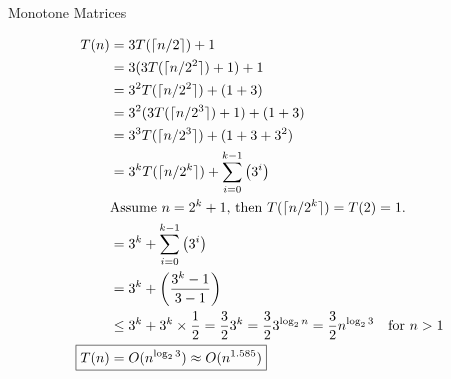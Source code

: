 \documentclass{article}
\begin{document}
\begin{section}{Monotone Matrices}
\begin{enumerate}
    \begin{align*}
        T(n) &= 3T(\ceil{n/2}) + 1 \\
        &= 3(3T(\ceil{n/2^2}) + 1) + 1 \\
        &= 3^2 T(\ceil{n/2^2}) + (1 + 3) \\
        &= 3^2 (3T(\ceil{n/2^3}) + 1) + (1 + 3) \\
        &= 3^3 T(\ceil{n/2^3}) + (1 + 3 + 3^2) \\
        &= 3^{k} T(\ceil{n/2^{k}}) + \sum_{i = 0}^{k-1}\pbracket{3^i} \\
        & \text{Assume $n = 2^k + 1$, then $T(\ceil{n/2^{k}}) = T(2) = 1$.} \\
        &= 3^{k} + \sum_{i = 0}^{k-1}\pbracket{3^i} \\
        &= 3^{k} + \pbracket{\frac{3^{k}-1}{3-1}} \\ 
        &\leq 3^k + 3^k \times \frac{1}{2} = \frac{3}{2}3^k = \frac{3}{2}3^{\log_2 n} = \frac{3}{2}n^{\log_2 3} \quad \text{for $n > 1$} \\
     \Aboxed{T(n) &= O(n^{\log_2 3}) \approx O(n^{1.585})}
    \end{align*}
\end{enumerate}
\end{section}
\newpage
\end{document}
